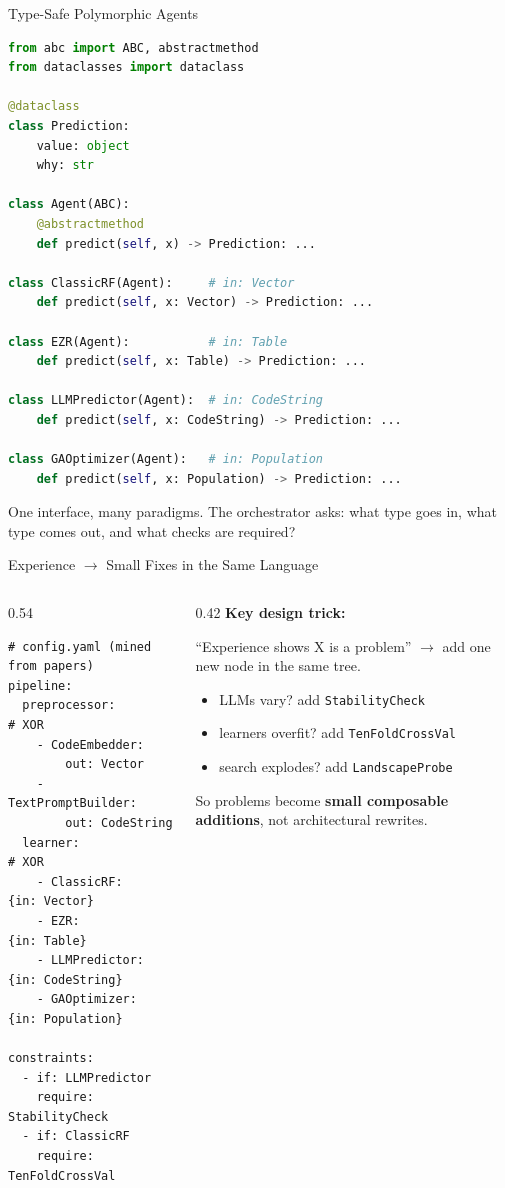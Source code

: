 \documentclass[9pt,aspectratio=169]{beamer}
\begin{document}
\begin{frame}[fragile]{Type-Safe Polymorphic Agents}
\begin{lstlisting}[language=Python]
from abc import ABC, abstractmethod
from dataclasses import dataclass

@dataclass
class Prediction:
    value: object
    why: str

class Agent(ABC):
    @abstractmethod
    def predict(self, x) -> Prediction: ...

class ClassicRF(Agent):     # in: Vector
    def predict(self, x: Vector) -> Prediction: ...

class EZR(Agent):           # in: Table
    def predict(self, x: Table) -> Prediction: ...

class LLMPredictor(Agent):  # in: CodeString
    def predict(self, x: CodeString) -> Prediction: ...

class GAOptimizer(Agent):   # in: Population
    def predict(self, x: Population) -> Prediction: ...
\end{lstlisting}

\small One interface, many paradigms. The orchestrator asks: what type goes in, what type comes out, and what checks are required?
\end{frame}

\begin{frame}[fragile]{Experience $\rightarrow$ Small Fixes in the Same Language}
\begin{columns}[T]
\begin{column}{0.54\textwidth}
\begin{lstlisting}
# config.yaml (mined from papers)
pipeline:
  preprocessor:        # XOR
    - CodeEmbedder:
        out: Vector
    - TextPromptBuilder:
        out: CodeString
  learner:             # XOR
    - ClassicRF:    {in: Vector}
    - EZR:          {in: Table}
    - LLMPredictor: {in: CodeString}
    - GAOptimizer:  {in: Population}

constraints:
  - if: LLMPredictor
    require: StabilityCheck
  - if: ClassicRF
    require: TenFoldCrossVal
\end{lstlisting}
\end{column}
\begin{column}{0.42\textwidth}
\small
\textbf{Key design trick:}

\medskip
``Experience shows X is a problem''
$\rightarrow$ add one new node in the same tree.

\medskip
\begin{itemize}
\item LLMs vary? add \texttt{StabilityCheck}
\item learners overfit? add \texttt{TenFoldCrossVal}
\item search explodes? add \texttt{LandscapeProbe}
\end{itemize}

\medskip
So problems become \textbf{small composable additions}, not architectural rewrites.
\end{column}
\end{columns}
\end{frame}
\end{document}
